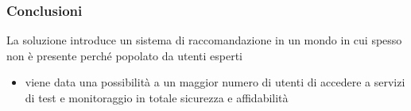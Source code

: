 \begin{frame}
    \frametitle{Conclusioni}
    La soluzione introduce un sistema di raccomandazione in un mondo in cui spesso non è presente perché 
    popolato da utenti esperti
    \begin{itemize}
        \item viene data una possibilità a un \alert{maggior numero di utenti} di accedere a servizi di test e 
        monitoraggio in totale sicurezza e affidabilità
    \end{itemize}
\end{frame}




